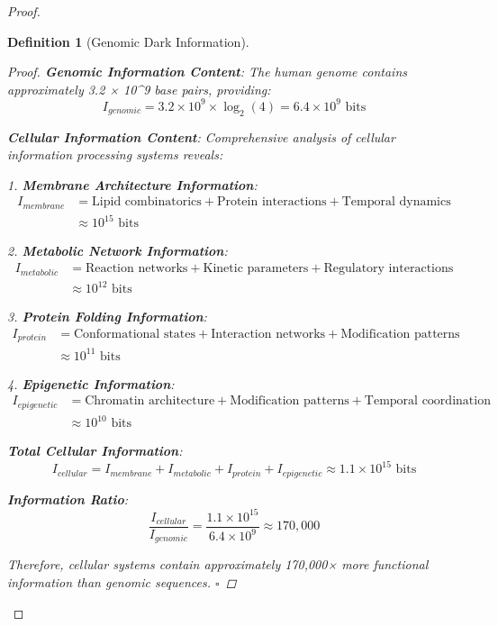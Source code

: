 \documentclass[12pt,a4paper]{article}
\newtheorem{definition}{Definition}
\begin{document}
\begin{proof}
\begin{definition}[Genomic Dark Information]
\begin{proof}
\textbf{Genomic Information Content}:
The human genome contains approximately 3.2 × 10^9 base pairs, providing:
\begin{equation}
I_{genomic} = 3.2 \times 10^9 \times \log_2(4) = 6.4 \times 10^9 \text{ bits}
\end{equation}

\textbf{Cellular Information Content}:
Comprehensive analysis of cellular information processing systems reveals:

1. \textbf{Membrane Architecture Information}:
\begin{align}
I_{membrane} &= \text{Lipid combinatorics} + \text{Protein interactions} + \text{Temporal dynamics} \\
&\approx 10^{15} \text{ bits}
\end{align}

2. \textbf{Metabolic Network Information}:
\begin{align}
I_{metabolic} &= \text{Reaction networks} + \text{Kinetic parameters} + \text{Regulatory interactions} \\
&\approx 10^{12} \text{ bits}
\end{align}

3. \textbf{Protein Folding Information}:
\begin{align}
I_{protein} &= \text{Conformational states} + \text{Interaction networks} + \text{Modification patterns} \\
&\approx 10^{11} \text{ bits}
\end{align}

4. \textbf{Epigenetic Information}:
\begin{align}
I_{epigenetic} &= \text{Chromatin architecture} + \text{Modification patterns} + \text{Temporal coordination} \\
&\approx 10^{10} \text{ bits}
\end{align}

\textbf{Total Cellular Information}:
\begin{equation}
I_{cellular} = I_{membrane} + I_{metabolic} + I_{protein} + I_{epigenetic} \approx 1.1 \times 10^{15} \text{ bits}
\end{equation}

\textbf{Information Ratio}:
\begin{equation}
\frac{I_{cellular}}{I_{genomic}} = \frac{1.1 \times 10^{15}}{6.4 \times 10^9} \approx 170,000
\end{equation}

Therefore, cellular systems contain approximately 170,000× more functional information than genomic sequences. $\square$
\end{proof}


\end{definition}
\end{proof}
\end{document}
